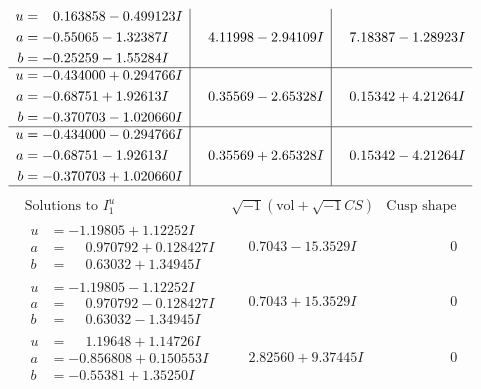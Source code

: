 \documentclass[1p]{elsarticle_modified}
\theoremstyle{definition}
\newcommand{\I}{\sqrt{-1}}
\begin{document}
$$\begin{array}{c|c|c}
\begin{aligned}
u &= \phantom{-}0.163858 - 0.499123 I \\
a &= -0.55065 - 1.32387 I \\
b &= -0.25259 - 1.55284 I\end{aligned}
 & \phantom{-}4.11998 - 2.94109 I & \phantom{-}7.18387 - 1.28923 I \\ \hline\begin{aligned}
u &= -0.434000 + 0.294766 I \\
a &= -0.68751 + 1.92613 I \\
b &= -0.370703 - 1.020660 I\end{aligned}
 & \phantom{-}0.35569 - 2.65328 I & \phantom{-}0.15342 + 4.21264 I \\ \hline\begin{aligned}
u &= -0.434000 - 0.294766 I \\
a &= -0.68751 - 1.92613 I \\
b &= -0.370703 + 1.020660 I\end{aligned}
 & \phantom{-}0.35569 + 2.65328 I & \phantom{-}0.15342 - 4.21264 I\\
 \hline 
 \end{array}$$\newpage$$\begin{array}{c|c|c}  
\text{Solutions to }I^u_{1}& \I (\text{vol} + \sqrt{-1}CS) & \text{Cusp shape}\\
 \hline 
\begin{aligned}
u &= -1.19805 + 1.12252 I \\
a &= \phantom{-}0.970792 + 0.128427 I \\
b &= \phantom{-}0.63032 + 1.34945 I\end{aligned}
 & \phantom{-}0.7043 - 15.3529 I & \phantom{-0.000000 } 0 \\ \hline\begin{aligned}
u &= -1.19805 - 1.12252 I \\
a &= \phantom{-}0.970792 - 0.128427 I \\
b &= \phantom{-}0.63032 - 1.34945 I\end{aligned}
 & \phantom{-}0.7043 + 15.3529 I & \phantom{-0.000000 } 0 \\ \hline\begin{aligned}
u &= \phantom{-}1.19648 + 1.14726 I \\
a &= -0.856808 + 0.150553 I \\
b &= -0.55381 + 1.35250 I\end{aligned}
 & \phantom{-}2.82560 + 9.37445 I & \phantom{-0.000000 } 0 \\ \hline\begin{aligned}

\end{aligned}
\end{array}$$
\end{document}
